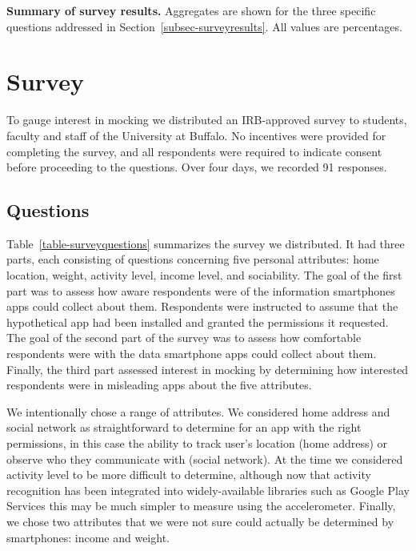 
\begin{table}[t]
  
  
  
  \caption{\textbf{Summary of survey results.} Aggregates are shown for the
    three specific questions addressed in Section~\ref{subsec-surveyresults}.
    All values are percentages.}
  
  \label{table-surveysummary}

\end{table}

\section{Survey}
\label{sec-survey}

To gauge interest in mocking we distributed an IRB-approved survey to
students, faculty and staff of the University at Buffalo. No incentives were
provided for completing the survey, and all respondents were required to
indicate consent before proceeding to the questions. Over four days, we
recorded 91 responses.

\subsection{Questions}

Table~\ref{table-surveyquestions} summarizes the survey we distributed. It
had three parts, each consisting of questions concerning five personal
attributes: home location, weight, activity level, income level, and
sociability. The goal of the first part was to assess how aware respondents
were of the information smartphones apps could collect about them.
Respondents were instructed to assume that the hypothetical app had been
installed and granted the permissions it requested. The goal of the second
part of the survey was to assess how comfortable respondents were with the
data smartphone apps could collect about them. Finally, the third part
assessed interest in mocking by determining how interested respondents were
in misleading apps about the five attributes.

We intentionally chose a range of attributes. We considered home address and
social network as straightforward to determine for an app with the right
permissions, in this case the ability to track user's location (home address)
or observe who they communicate with (social network). At the time we
considered activity level to be more difficult to determine, although now
that activity recognition has been integrated into widely-available libraries
such as Google Play Services this may be much simpler to measure using the
accelerometer. Finally, we chose two attributes that we were not sure could
actually be determined by smartphones: income and weight.

